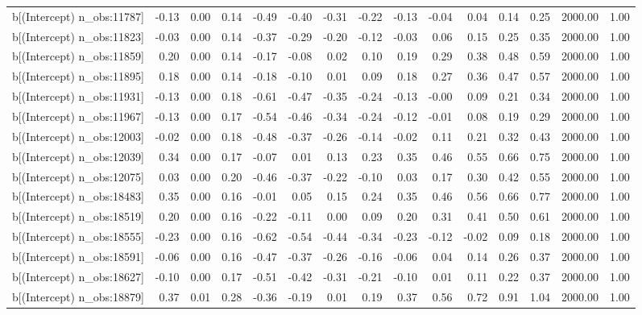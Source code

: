 \begin{table}[ht]
\begin{tabular}{rrrrrrrrrrrrrrr}
  b[(Intercept) n\_obs:11787] & -0.13 & 0.00 & 0.14 & -0.49 & -0.40 & -0.31 & -0.22 & -0.13 & -0.04 & 0.04 & 0.14 & 0.25 & 2000.00 & 1.00 \\ 
  b[(Intercept) n\_obs:11823] & -0.03 & 0.00 & 0.14 & -0.37 & -0.29 & -0.20 & -0.12 & -0.03 & 0.06 & 0.15 & 0.25 & 0.35 & 2000.00 & 1.00 \\ 
  b[(Intercept) n\_obs:11859] & 0.20 & 0.00 & 0.14 & -0.17 & -0.08 & 0.02 & 0.10 & 0.19 & 0.29 & 0.38 & 0.48 & 0.59 & 2000.00 & 1.00 \\ 
  b[(Intercept) n\_obs:11895] & 0.18 & 0.00 & 0.14 & -0.18 & -0.10 & 0.01 & 0.09 & 0.18 & 0.27 & 0.36 & 0.47 & 0.57 & 2000.00 & 1.00 \\ 
  b[(Intercept) n\_obs:11931] & -0.13 & 0.00 & 0.18 & -0.61 & -0.47 & -0.35 & -0.24 & -0.13 & -0.00 & 0.09 & 0.21 & 0.34 & 2000.00 & 1.00 \\ 
  b[(Intercept) n\_obs:11967] & -0.13 & 0.00 & 0.17 & -0.54 & -0.46 & -0.34 & -0.24 & -0.12 & -0.01 & 0.08 & 0.19 & 0.29 & 2000.00 & 1.00 \\ 
  b[(Intercept) n\_obs:12003] & -0.02 & 0.00 & 0.18 & -0.48 & -0.37 & -0.26 & -0.14 & -0.02 & 0.11 & 0.21 & 0.32 & 0.43 & 2000.00 & 1.00 \\ 
  b[(Intercept) n\_obs:12039] & 0.34 & 0.00 & 0.17 & -0.07 & 0.01 & 0.13 & 0.23 & 0.35 & 0.46 & 0.55 & 0.66 & 0.75 & 2000.00 & 1.00 \\ 
  b[(Intercept) n\_obs:12075] & 0.03 & 0.00 & 0.20 & -0.46 & -0.37 & -0.22 & -0.10 & 0.03 & 0.17 & 0.30 & 0.42 & 0.55 & 2000.00 & 1.00 \\ 
  b[(Intercept) n\_obs:18483] & 0.35 & 0.00 & 0.16 & -0.01 & 0.05 & 0.15 & 0.24 & 0.35 & 0.46 & 0.56 & 0.66 & 0.77 & 2000.00 & 1.00 \\ 
  b[(Intercept) n\_obs:18519] & 0.20 & 0.00 & 0.16 & -0.22 & -0.11 & 0.00 & 0.09 & 0.20 & 0.31 & 0.41 & 0.50 & 0.61 & 2000.00 & 1.00 \\ 
  b[(Intercept) n\_obs:18555] & -0.23 & 0.00 & 0.16 & -0.62 & -0.54 & -0.44 & -0.34 & -0.23 & -0.12 & -0.02 & 0.09 & 0.18 & 2000.00 & 1.00 \\ 
  b[(Intercept) n\_obs:18591] & -0.06 & 0.00 & 0.16 & -0.47 & -0.37 & -0.26 & -0.16 & -0.06 & 0.04 & 0.14 & 0.26 & 0.37 & 2000.00 & 1.00 \\ 
  b[(Intercept) n\_obs:18627] & -0.10 & 0.00 & 0.17 & -0.51 & -0.42 & -0.31 & -0.21 & -0.10 & 0.01 & 0.11 & 0.22 & 0.37 & 2000.00 & 1.00 \\ 
  b[(Intercept) n\_obs:18879] & 0.37 & 0.01 & 0.28 & -0.36 & -0.19 & 0.01 & 0.19 & 0.37 & 0.56 & 0.72 & 0.91 & 1.04 & 2000.00 & 1.00 \\ 

\end{tabular}
\end{table}

